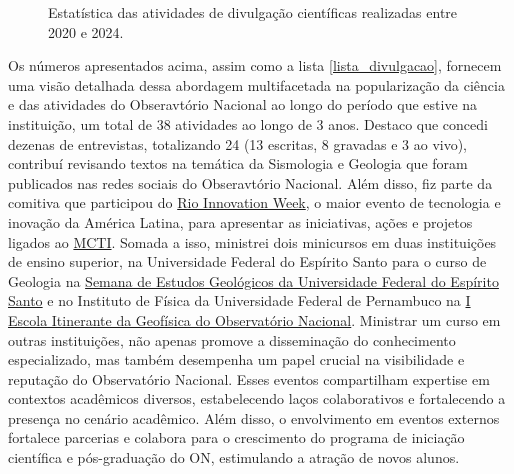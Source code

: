 \documentclass[10pt,a4paper,oneside]{book}
\begin{document}
\begin{figure}
	\centering
	\caption{Estatística das atividades de divulgação científicas realizadas entre 2020 e 2024.}
	\label{fig_resumo_divulgacao}
\end{figure}

Os números apresentados acima, assim como a lista \ref{lista_divulgacao}, fornecem uma visão detalhada dessa abordagem multifacetada na popularização da ciência e das atividades do Obseravtório Nacional ao longo do período que estive na instituição, um total de 38 atividades ao longo de 3 anos. Destaco que concedi dezenas de entrevistas, totalizando 24 (13 escritas, 8 gravadas e 3 ao vivo), contribuí revisando textos na temática da Sismologia e Geologia que foram publicados nas redes sociais do Obseravtório Nacional. Além disso, fiz parte da comitiva que participou do \href{https://www.gov.br/observatorio/pt-br/assuntos/areas-de-atuacao/divulgacao-e-popularizacao-da-ciencia/on-riw}{Rio Innovation Week}, o maior evento de tecnologia e inovação da América Latina, para apresentar as iniciativas, ações e projetos ligados ao \href{https://www.gov.br/mcti/pt-br}{MCTI}. Somada a isso, ministrei dois minicursos em duas instituições de ensino superior, na Universidade Federal do Espírito Santo para o curso de Geologia na \href{https://www.instagram.com/segeo.ufes/}{Semana de Estudos Geológicos da Universidade Federal do Espírito Santo} e no Instituto de Física da Universidade Federal de Pernambuco na \href{https://www.gov.br/observatorio/pt-br/assuntos/noticias/i-escola-itinerante-da-geofisica-do-observatorio-nacional-e-realizada-na-ufpe}{I Escola Itinerante da Geofísica do Observatório Nacional}. Ministrar um curso em outras instituições, não apenas promove a disseminação do conhecimento especializado, mas também desempenha um papel crucial na visibilidade e reputação do Observatório Nacional. Esses eventos compartilham expertise em contextos acadêmicos diversos, estabelecendo laços colaborativos e fortalecendo a presença no cenário acadêmico. Além disso, o envolvimento em eventos externos fortalece parcerias e colabora para o crescimento do programa de iniciação científica e pós-graduação do ON, estimulando a atração de novos alunos.
\end{document}
